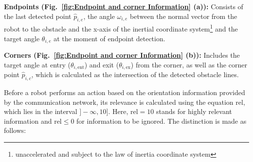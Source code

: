 \documentclass[conference]{IEEEtran}
\begin{document}
\textbf{Endpoints (Fig.~\ref{fig:Endpoint and corner Information} (a)):} 
Consists of the last detected point \( \hat{p}_{i,e} \), the angle \( \omega_{i,e} \) 
between the normal vector from the robot to the obstacle and the x-axis of the inertial 
coordinate system\footnote{unaccelerated and subject to the law of inertia 
coordinate system} and the target angle \( \theta_{i,e} \) at the moment of endpoint detection.

\textbf{Corners (Fig.~\ref{fig:Endpoint and corner Information} (b)):} 
Includes the target angle at entry (\( \theta_{i,\mathrm{ent}} \)) and exit 
(\( \theta_{i,\mathrm{ex}} \)) from the corner, as well as the corner point \( \hat{p}_{i,c} \), 
which is calculated as the intersection of the detected obstacle lines.

Before a robot performs an action based on the orientation information provided by 
the communication network, its relevance is calculated using the equation \( \mathrm{rel} \), 
which lies in the interval \( ]-\infty, 10] \). Here, \( \mathrm{rel}=10 \) stands for 
highly relevant information and \( \mathrm{rel} \leq 0 \) for information to be ignored. 
The distinction is made as follows:
\end{document}
